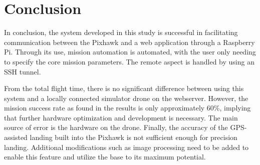 \setlength{\footskip}{8mm}

\chapter{Conclusion}
\label{ch:conclusion}


In conclusion, the system developed in this study is successful in facilitating communication between the Pixhawk and a web application through a Raspberry Pi. Through its use, mission automation is automated, with the user only needing to specify the core mission parameters. The remote aspect is handled by using an SSH tunnel.

From the total flight time, there is no significant difference between using this system and a locally connected simulator drone on the webserver. However, the mission success rate as found in the results is only approximately 60\%, implying that further hardware optimization and development is necessary. The main source of error is the hardware on the drone. Finally, the accuracy of the GPS-assisted landing built into the Pixhawk is not sufficient enough for precision landing. Additional modifications such as image processing need to be added to enable this feature and utilize the base to its maximum potential.


\FloatBarrier

